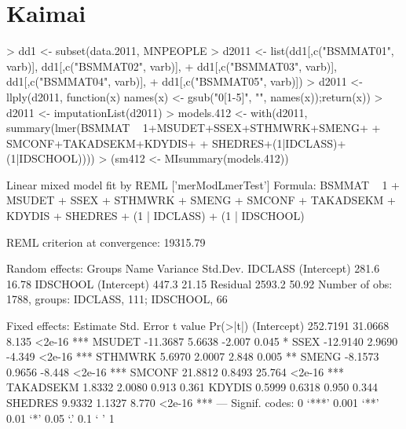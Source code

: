 \documentclass[a4paper]{article}
\begin{document}
\section{Kaimai}
\begin{Schunk}
\begin{Sinput}
> dd1 <- subset(data.2011, MNPEOPLE %in% 5:6)
> d2011 <- list(dd1[,c("BSMMAT01", varb)], dd1[,c("BSMMAT02", varb)], 
+               dd1[,c("BSMMAT03", varb)], dd1[,c("BSMMAT04", varb)],
+               dd1[,c("BSMMAT05", varb)])
> d2011 <- llply(d2011, function(x) {names(x) <- gsub("0[1-5]", "", names(x));return(x)})
> d2011 <- imputationList(d2011)
> models.412 <- with(d2011, summary(lmer(BSMMAT ~ 1+MSUDET+SSEX+STHMWRK+SMENG+
+                                          SMCONF+TAKADSEKM+KDYDIS+
+                                          SHEDRES+(1|IDCLASS)+(1|IDSCHOOL))))
> (sm412 <- MIsummary(models.412))
\end{Sinput}
\begin{Soutput}
Linear mixed model fit by REML ['merModLmerTest']
Formula: BSMMAT ~ 1 + MSUDET + SSEX + STHMWRK + SMENG + SMCONF + TAKADSEKM +      KDYDIS + SHEDRES + (1 | IDCLASS) + (1 | IDSCHOOL) 

REML criterion at convergence: 19315.79 

Random effects:
 Groups   Name        Variance Std.Dev.
 IDCLASS  (Intercept)  281.6   16.78   
 IDSCHOOL (Intercept)  447.3   21.15   
 Residual             2593.2   50.92   
Number of obs: 1788, groups: IDCLASS, 111; IDSCHOOL, 66

Fixed effects:
            Estimate Std. Error t value Pr(>|t|)    
(Intercept) 252.7191    31.0668   8.135   <2e-16 ***
MSUDET      -11.3687     5.6638  -2.007    0.045 *  
SSEX        -12.9140     2.9690  -4.349   <2e-16 ***
STHMWRK       5.6970     2.0007   2.848    0.005 ** 
SMENG        -8.1573     0.9656  -8.448   <2e-16 ***
SMCONF       21.8812     0.8493  25.764   <2e-16 ***
TAKADSEKM     1.8332     2.0080   0.913    0.361    
KDYDIS        0.5999     0.6318   0.950    0.344    
SHEDRES       9.9332     1.1327   8.770   <2e-16 ***
---
Signif. codes:  0 ‘***’ 0.001 ‘**’ 0.01 ‘*’ 0.05 ‘.’ 0.1 ‘ ’ 1


\end{Soutput}
\end{Schunk}
\end{document}

